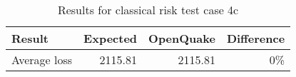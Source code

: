 \begin{table}[htbp]

\centering
\begin{tabular}{ l r r r }

\hline
\rowcolor{anti-flashwhite}
\bf{Result} & \bf{Expected} & \bf{OpenQuake} & \bf{Difference}\\
\hline
Average loss & 2115.81 & 2115.81 & 0\% \\
\hline
\end{tabular}

\caption{Results for classical risk test case 4c}
\label{tab:result-cr-4c}
\end{table}